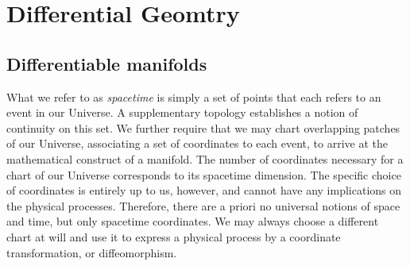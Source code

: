 \chapter{Differential Geomtry}
\label{ch:diffgeo}
\section{Differentiable manifolds}
What we refer to as \emph{spacetime} is simply a set of points that each refers to an event in our
Universe. A supplementary topology establishes a notion of continuity on this set. We
further require that we may chart overlapping patches of our Universe, associating a set
of coordinates to each event, to arrive at the mathematical construct of a manifold. The
number of coordinates necessary for a chart of our Universe corresponds to its spacetime
dimension. The specific choice of coordinates is entirely up to us, however, and cannot
have any implications on the physical processes. Therefore, there are a priori no universal
notions of space and time, but only spacetime coordinates. We may always choose a different chart at will and use it to express a physical process by a coordinate transformation,
or diffeomorphism. 

